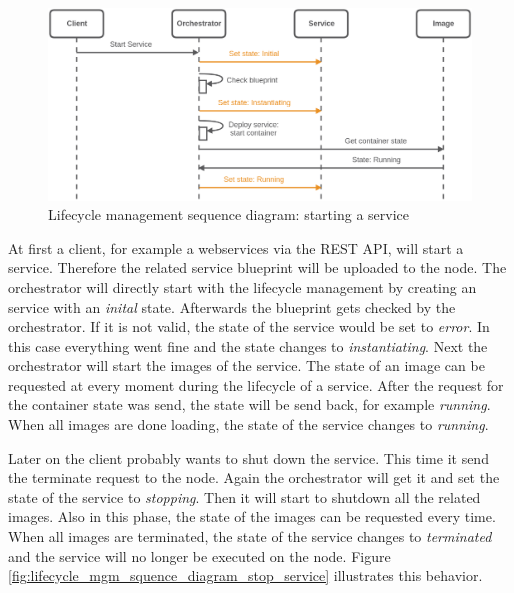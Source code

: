 \begin{figure}[H]
    \centering
    \includegraphics[width=\textwidth]{resources/images/lifecycle_sequence_diagram_start_service.png}
    \caption[Lifecycle management sequence diagram: starting a service]{Lifecycle management sequence diagram: starting a service}
    \label{fig:lifecycle_mgm_squence_diagram_start_service}
\end{figure}

At first a client, for example a webservices via the \ac{REST} \ac{API}, will start a service.
Therefore the related service blueprint will be uploaded to the node.
The orchestrator will directly start with the lifecycle management by creating an service with an \textit{inital} state.
Afterwards the blueprint gets checked by the orchestrator.
If it is not valid, the state of the service would be set to \textit{error}.
In this case everything went fine and the state changes to \textit{instantiating}.
Next the orchestrator will start the images of the service.
The state of an image can be requested at every moment during the lifecycle of a service.
After the request for the container state was send, the state will be send back, for example \textit{running}.
When all images are done loading, the state of the service changes to \textit{running}.

Later on the client probably wants to shut down the service.
This time it send the terminate request to the node.
Again the orchestrator will get it and set the state of the service to \textit{stopping}.
Then it will start to shutdown all the related images.
Also in this phase, the state of the images can be requested every time.
When all images are terminated, the state of the service changes to \textit{terminated} and the service will no longer be executed on the node.
Figure \ref{fig:lifecycle_mgm_squence_diagram_stop_service} illustrates this behavior.

